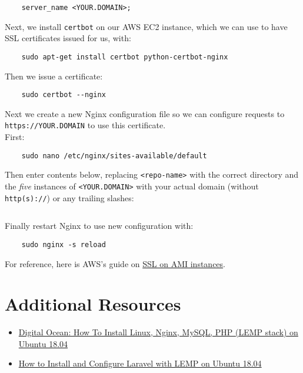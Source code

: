 \begin{verbatim}
    server_name <YOUR.DOMAIN>;
\end{verbatim}

Next, we install \texttt{certbot} on our AWS EC2 instance, which we can use to have SSL certificates issued for us, with:

\begin{verbatim}
    sudo apt-get install certbot python-certbot-nginx
\end{verbatim}

Then we issue a certificate:

\begin{verbatim}
    sudo certbot --nginx
\end{verbatim}

Next we create a new Nginx configuration file so we can configure requests to \texttt{https://YOUR.DOMAIN} to use this certificate.
\\

First:

\begin{verbatim}
    sudo nano /etc/nginx/sites-available/default
\end{verbatim}

Then enter contents below, replacing \texttt{<repo-name>} with the correct directory and the \textit{five} instances of \texttt{<YOUR.DOMAIN>} with your actual domain (without \texttt{http(s)://}) or any trailing slashes:

\inputminted{nginx}{04/resources/01/01-nginx-https.conf}

Finally restart Nginx to use new configuration with:

\begin{verbatim}
    sudo nginx -s reload
\end{verbatim}

For reference, here is AWS's guide on \href{https://docs.aws.amazon.com/AWSEC2/latest/UserGuide/SSL-on-amazon-linux-ami.html}{SSL on AMI instances}.

\section{Additional Resources}

\begin{itemize}[leftmargin=*]
    \item \href{https://www.digitalocean.com/community/tutorials/how-to-install-linux-nginx-mysql-php-lemp-stack-ubuntu-18-04}{Digital Ocean: How To Install Linux, Nginx, MySQL, PHP (LEMP stack) on Ubuntu 18.04}
    \item \href{https://www.digitalocean.com/community/tutorials/how-to-install-and-configure-laravel-with-lemp-on-ubuntu-18-04}{How to Install and Configure Laravel with LEMP on Ubuntu 18.04}
\end{itemize}

